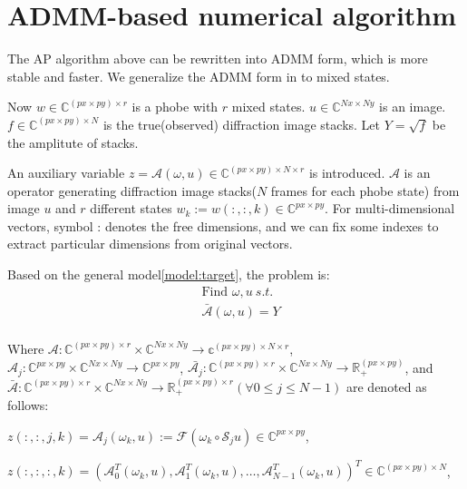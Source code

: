 \documentclass{article}
\numberwithin{equation}{section}
\begin{document}
\section{ADMM-based numerical algorithm}

The AP algorithm above can be rewritten into ADMM form, which is more stable and faster. We generalize the ADMM form in \cite{admm} to mixed states.

Now $w \in \mathbb{C}^{(px\times py) \times r}$ is a phobe with $r$ mixed states. $u \in \mathbb{C}^{Nx\times Ny}$ is an image.  $f \in \mathbb{C}^{(px \times py) \times N}$ is the true(observed) diffraction image stacks. Let $Y=\sqrt{f}$ be the amplitute of stacks.

An auxiliary variable $z=\mathcal{A}(\omega, u) \in \mathbb{C}^{(px \times py) \times N \times r}$ is introduced. $\mathcal{A}$ is an operator generating diffraction image stacks($N$ frames for each phobe state) from image $u$ and $r$ different states $w_k:=w(:,:,k) \in \mathbb{C}^{px \times py}$. For multi-dimensional vectors, symbol : denotes the free dimensions, and we can fix some indexes to extract particular dimensions from original vectors.  

Based on the general model\ref{model:target}, the problem is:
$$
\begin{aligned}
&\mbox{Find } \omega,u \ s.t.\\
& \bar{\mathcal{A}}(\omega, u)=Y\\
\end{aligned}
$$


Where $\mathcal{A}: \mathbb{C}^{(px\times py)\times r} \times \mathbb{C}^{Nx \times Ny} \rightarrow \mathbb{c}^{(px \times py) \times N \times r}$,$\mathcal{A}_{j}: \mathbb{C}^{px\times py} \times \mathbb{C}^{Nx \times Ny} \rightarrow \mathbb{C}^{px\times py} $,
$\bar{\mathcal{A}_j}:\mathbb{C}^{(px\times py)\times r} \times \mathbb{C}^{Nx \times Ny} \rightarrow \mathbb{R}_+^{(px \times py)}$, and $\bar{\mathcal{A}}:\mathbb{C}^{(px\times py)\times r} \times \mathbb{C}^{Nx \times Ny} \rightarrow \mathbb{R}_+^{(px \times py) \times r} (\forall 0 \leq j \leq N-1)$ are
denoted as follows:

$z(:,:,j,k) = \mathcal{A}_{j}(\omega_k, u):=\mathcal{F}\left(\omega_k \circ \mathcal{S}_{j} u\right) \in \mathbb{C}^{px\times py}$,

$z(:,:,:,k) =\left(\mathcal{A}_{0}^{T}(\omega_k, u), \mathcal{A}_{1}^{T}(\omega_k, u), \ldots, \mathcal{A}_{N-1}^{T}(\omega_k, u)\right)^{T} 
\in \mathbb{C}^{(px\times py) \times N}$,
\end{document}

